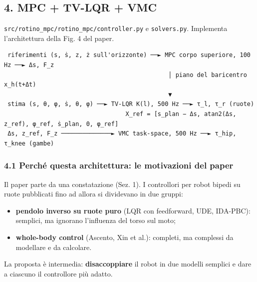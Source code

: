 \documentclass[
]{article}
\providecommand{\tightlist}{%
  \setlength{\itemsep}{0pt}\setlength{\parskip}{0pt}}
\begin{document}
\subsection{4. MPC + TV-LQR + VMC}\label{4-mpc-tv-lqr-vmc}

\texttt{src/rotino\_mpc/rotino\_mpc/controller.py} e \texttt{solvers.py}. Implementa l'architettura della Fig. 4 del paper.

\begin{verbatim}
 riferimenti (s, ṡ, z, ż sull'orizzonte) ──► MPC corpo superiore, 100 Hz ──► Δs, F_z
                                              │ piano del baricentro x_h(t+Δt)
                                              ▼
 stima (s, θ, φ, ṡ, θ, φ) ──► TV-LQR K(l), 500 Hz ──► τ_l, τ_r (ruote)
                                  X_ref = [s_plan − Δs, atan2(Δs, z_ref), φ_ref, ṡ_plan, 0, φ_ref]
 Δs, z_ref, F_z ──────────────► VMC task-space, 500 Hz ──► τ_hip, τ_knee (gambe)
\end{verbatim}

\subsubsection{4.1 Perché questa architettura: le motivazioni del paper}\label{41-perché-questa-architettura-le-motivazioni-del-paper}

Il paper parte da una constatazione (Sez. 1). I controllori per robot bipedi su ruote pubblicati fino ad allora si dividevano in due gruppi:

\begin{itemize}
\tightlist
\item \textbf{pendolo inverso su ruote puro} (LQR con feedforward, UDE, IDA-PBC): semplici, ma ignorano l'influenza del torso sul moto;
\item \textbf{whole-body control} (Ascento, Xin et al.): completi, ma complessi da modellare e da calcolare.
\end{itemize}

La proposta è intermedia: \textbf{disaccoppiare} il robot in due modelli semplici e dare a ciascuno il controllore più adatto.
\end{document}
